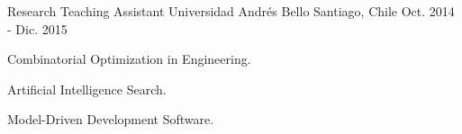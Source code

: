 
\begin{cventries}

  \cventry
    {Research Teaching Assistant} %
    {Universidad Andrés Bello} %
    {Santiago, Chile} %
    {Oct. 2014 - Dic. 2015} %
    {
      \begin{cvitems} %
      	\item {Combinatorial Optimization in Engineering.}
      	\item {Artificial Intelligence Search.}
	\item {Model-Driven Development Software.}
      \end{cvitems}
    }
\end{cventries}

